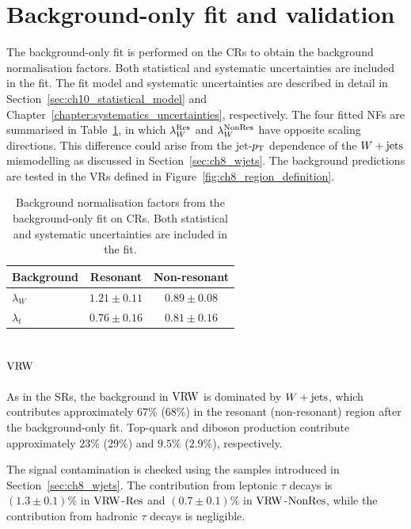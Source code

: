 \section{Background-only fit and validation}
\label{sec:ch8_validation}

The background-only fit is performed on the CRs to obtain the background normalisation factors.
Both statistical and systematic uncertainties are included in the fit. The fit model and systematic uncertainties are described in detail in Section~\ref{sec:ch10_statistical_model} and Chapter~\ref{chapter:systematics_uncertainties}, respectively.
The four fitted NFs are summarised in Table~\ref{tab:ch8_normalisation}, in which $\lambda_W^{\mathrm{Res}}$ and $\lambda_W^{\mathrm{NonRes}}$ have opposite scaling directions. This difference could arise from the jet-$p_{\mathrm{T}}$ dependence of the $W+\mathrm{jets}$ mismodelling as discussed in Section~\ref{sec:ch8_wjets}.
The background predictions are tested in the VRs defined in Figure~\ref{fig:ch8_region_definition}.

\begin{table}[htbp]
    \centering
    \caption[Background normalisation factors from the background-only fit]{Background normalisation factors from the background-only fit on CRs. Both statistical and systematic uncertainties are included in the fit.}
    \label{tab:ch8_normalisation}
    \begin{tabular}{lcc}
        \toprule
        Background & Resonant & Non-resonant \\
        \midrule
        $\lambda_W$ & $1.21\pm0.11$ & $0.89\pm0.08$ \\
        $\lambda_t$ & $0.76\pm0.16$ & $0.81\pm0.16$ \\
        \bottomrule
    \end{tabular}
\end{table}

\subsection[VRW]{$\mathrm{VRW}$}
\label{subsec:ch8_vrw}

As in the SRs, the background in $\mathrm{VRW}$ is dominated by $W+\mathrm{jets}$, which contributes approximately $67\%$ ($68\%$) in the resonant (non-resonant) region after the background-only fit.
Top-quark and diboson production contribute approximately $23\%$ ($29\%$) and $9.5\%$ ($2.9\%$), respectively.

The signal contamination is checked using the samples introduced in Section~\ref{sec:ch8_wjets}.
The contribution from leptonic $\tau$ decays is $(1.3\pm0.1)\%$ in $\mathrm{VRW}$-$\mathrm{Res}$ and $(0.7\pm0.1)\%$ in $\mathrm{VRW}$-$\mathrm{NonRes}$, while the contribution from hadronic $\tau$ decays is negligible.

